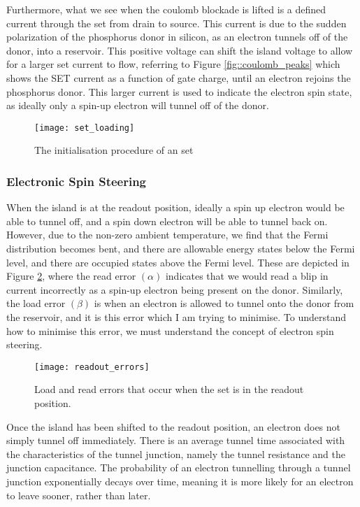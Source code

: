 Furthermore, what we see when the coulomb blockade is lifted is a defined current through the \gls{set} from drain to source. This current is due to the sudden polarization of the phosphorus donor in silicon, as an electron tunnels off of the donor, into a reservoir. This positive voltage can shift the island voltage to allow for a larger \gls{set} current to flow, referring to Figure \ref{fig::coulomb_peaks} which shows the SET current as a function of gate charge, until an electron rejoins the phosphorus donor. This larger current is used to indicate the electron spin state, as ideally only a spin-up electron will tunnel off of the donor.

\begin{figure}[htbp!]
	\centering
	\texttt{[image: set\_loading]}
	\caption{The initialisation procedure of an \gls{set}\cite{morello2010single}}
	\label{fig::set_loading}
\end{figure}


\subsubsection{Electronic Spin Steering}

When the island is at the readout position, ideally a spin up electron would be able to tunnel off, and a spin down electron will be able to tunnel back on. However, due to the non-zero ambient temperature, we find that the Fermi distribution becomes bent, and there are allowable energy states below the Fermi level, and there are occupied states above the Fermi level. These are depicted in Figure \ref{fig::errors}, where the read error $(\alpha)$ indicates that we would read a blip in current incorrectly as a spin-up electron being present on the donor. Similarly, the load error $(\beta)$ is when an electron is allowed to tunnel onto the donor from the reservoir, and it is this error which I am trying to minimise. To understand how to minimise this error, we must understand the concept of electron spin steering.

\begin{figure}[htbp!]
	\centering
	\texttt{[image: readout\_errors]}
	\caption{Load and read errors that occur when the \gls{set} is in the readout position.\cite{electron_spin_silicon}}
	\label{fig::errors}
\end{figure}


Once the island has been shifted to the readout position, an electron does not simply tunnel off immediately. There is an average tunnel time associated with the characteristics of the tunnel junction, namely the tunnel resistance and the junction capacitance. The probability of an electron tunnelling through a tunnel junction exponentially decays over time, meaning it is more likely for an electron to leave sooner, rather than later. \\

